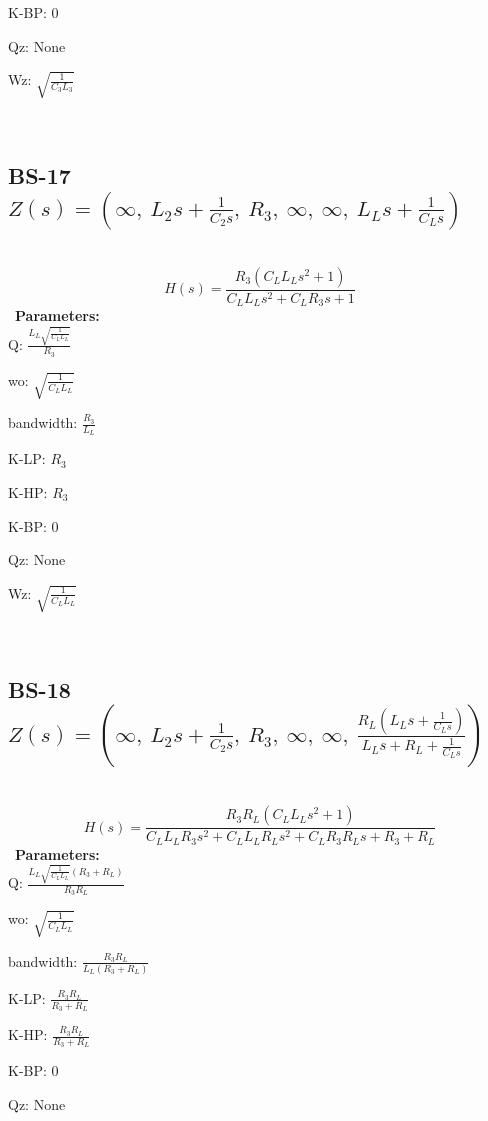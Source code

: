 \documentclass{article}
\begin{document}
K-BP: $0$\ 

Qz: $\text{None}$\ 

Wz: $\sqrt{\frac{1}{C_{3} L_{3}}}$\ 

\ 

\subsection{BS-17 $Z(s) = \left( \infty, \  L_{2} s + \frac{1}{C_{2} s}, \  R_{3}, \  \infty, \  \infty, \  L_{L} s + \frac{1}{C_{L} s}\right)$ } \ 
\textbf{\[H(s) = \frac{R_{3} \left(C_{L} L_{L} s^{2} + 1\right)}{C_{L} L_{L} s^{2} + C_{L} R_{3} s + 1}\] } \ 
\textbf{Parameters:}\\ 

Q: $\frac{L_{L} \sqrt{\frac{1}{C_{L} L_{L}}}}{R_{3}}$\ 

wo: $\sqrt{\frac{1}{C_{L} L_{L}}}$\ 

bandwidth: $\frac{R_{3}}{L_{L}}$\ 

K-LP: $R_{3}$\ 

K-HP: $R_{3}$\ 

K-BP: $0$\ 

Qz: $\text{None}$\ 

Wz: $\sqrt{\frac{1}{C_{L} L_{L}}}$\ 

\ 

\subsection{BS-18 $Z(s) = \left( \infty, \  L_{2} s + \frac{1}{C_{2} s}, \  R_{3}, \  \infty, \  \infty, \  \frac{R_{L} \left(L_{L} s + \frac{1}{C_{L} s}\right)}{L_{L} s + R_{L} + \frac{1}{C_{L} s}}\right)$ } \ 
\textbf{\[H(s) = \frac{R_{3} R_{L} \left(C_{L} L_{L} s^{2} + 1\right)}{C_{L} L_{L} R_{3} s^{2} + C_{L} L_{L} R_{L} s^{2} + C_{L} R_{3} R_{L} s + R_{3} + R_{L}}\] } \ 
\textbf{Parameters:}\\ 

Q: $\frac{L_{L} \sqrt{\frac{1}{C_{L} L_{L}}} \left(R_{3} + R_{L}\right)}{R_{3} R_{L}}$\ 

wo: $\sqrt{\frac{1}{C_{L} L_{L}}}$\ 

bandwidth: $\frac{R_{3} R_{L}}{L_{L} \left(R_{3} + R_{L}\right)}$\ 

K-LP: $\frac{R_{3} R_{L}}{R_{3} + R_{L}}$\ 

K-HP: $\frac{R_{3} R_{L}}{R_{3} + R_{L}}$\ 

K-BP: $0$\ 

Qz: $\text{None}$\ 
\end{document}
